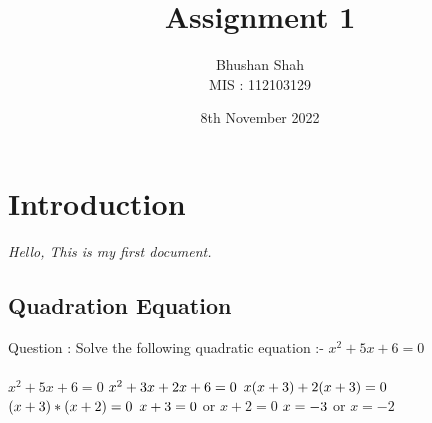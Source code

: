 \documentclass[12pt]{article}
\title{\textbf{Assignment 1}}
\author{Bhushan Shah \\ MIS : 112103129}
\date{8th November 2022}
\begin{document}
\maketitle
\newpage
\tableofcontents
\clearpage
\section{Introduction}
\emph{Hello, This is my first document.}
\subsection{Quadration Equation}
Question : Solve the following quadratic equation :- 
$x ^ 2 + 5x + 6 = 0$
\\
\\
$x ^ 2 + 5x + 6 = 0$
$\\ x ^ 2 + 3x + 2x + 6 = 0$
$\\ x(x + 3) + 2(x + 3) = 0$
$\\ (x + 3) * (x + 2) = 0$
$\\ x + 3 = 0$ or $x + 2 = 0$
$\\ x = -3$ or $x = -2$
\clearpage
\end{document}
